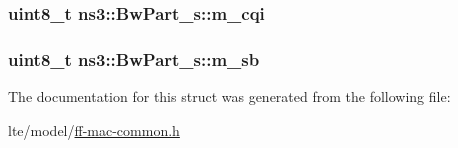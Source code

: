 \subsubsection[{\texorpdfstring{m\+\_\+cqi}{m_cqi}}]{\setlength{\rightskip}{0pt plus 5cm}uint8\+\_\+t ns3\+::\+Bw\+Part\+\_\+s\+::m\+\_\+cqi}\hypertarget{structns3_1_1BwPart__s_a5062684d47530c37039b715b2a21750e}{}\label{structns3_1_1BwPart__s_a5062684d47530c37039b715b2a21750e}
\subsubsection[{\texorpdfstring{m\+\_\+sb}{m_sb}}]{\setlength{\rightskip}{0pt plus 5cm}uint8\+\_\+t ns3\+::\+Bw\+Part\+\_\+s\+::m\+\_\+sb}\hypertarget{structns3_1_1BwPart__s_a90ce1004412d0bb7361b6dff14233e92}{}\label{structns3_1_1BwPart__s_a90ce1004412d0bb7361b6dff14233e92}


The documentation for this struct was generated from the following file\+:\begin{DoxyCompactItemize}
\item 
lte/model/\hyperlink{ff-mac-common_8h}{ff-\/mac-\/common.\+h}\end{DoxyCompactItemize}
